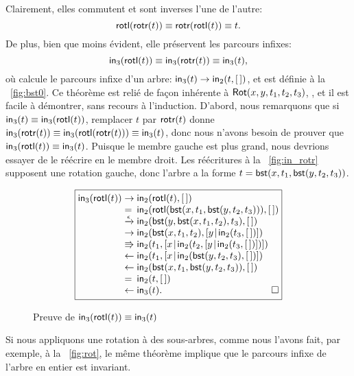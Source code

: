 Clairement, elles commutent et sont inverses l'une de l'autre:
\begin{equation*}
\abovedisplayskip=5pt
\belowdisplayskip=5pt
\fun{rotl}(\fun{rotr}(t)) \equiv \fun{rotr}(\fun{rotl}(t)) \equiv t.
\end{equation*}
De plus, bien que moins évident, elle préservent les parcours infixes:
\begin{equation*}
  \abovedisplayskip=5pt
  \belowdisplayskip=5pt
  \fun{in}_3(\fun{rotl}(t)) \equiv \fun{in}_3(\fun{rotr}(t)) \equiv
  \fun{in}_3(t),
\end{equation*}
où  calcule le parcours
infixe d'un arbre: \(\textsf{in}_3(t) \rightarrow \textsf{in}_2(t,[\,])\), et
 est définie à la
\fig~\vref{fig:bst0}. Ce théorème est relié de façon inhérente à
\(\textsf{Rot}({x,y,t_1,t_2,t_3})\),
, et il est facile à démontrer, sans recours à
l'induction. D'abord, nous remarquons que si \(\textsf{in}_3(t) \equiv
\textsf{in}_3(\textsf{rotl}(t))\), remplacer \(t\) par \(\textsf{rotr}(t)\)
donne \(\textsf{in}_3(\textsf{rotr}(t)) \equiv
\textsf{in}_3(\textsf{rotl}(\textsf{rotr}(t))) \equiv \textsf{in}_3(t)\), donc
nous n'avons besoin de prouver que \(\textsf{in}_3(\textsf{rotl}(t)) \equiv
\textsf{in}_3(t)\). Puisque le membre gauche est plus grand, nous
devrions essayer de le réécrire en le membre droit. Les réécritures à
la \fig~\vref{fig:in_rotr} supposent une rotation gauche, donc l'arbre
a la forme \(t=\textsf{bst}(x,t_1,\textsf{bst}(y,t_2,t_3))\).
\begin{figure}
  \begin{equation*}
    \boxed{
      \begin{array}{@{}r@{\;}l@{\;}l@{}}
  \fun{in}_3(\fun{rotl}(t))
  & \rightarrow & \fun{in}_2(\fun{rotl}(t),\el)\\
  & = & \fun{in}_2(\fun{rotl}(\fun{bst}(x,t_1,\fun{bst}(y,t_2,t_3))),\el)\\
  & \xrightarrow{\smash{\epsilon}} &
  \fun{in}_2(\fun{bst}(y,\fun{bst}(x,t_1,t_2),t_3),\el)\\
  & \rightarrow &
  \fun{in}_2(\fun{bst}(x,t_1,t_2),\cons{y}{\fun{in}_2(t_3,\el)})\\
  & \Rrightarrow &
 \fun{in}_2(t_1,\cons{x}{\fun{in}_2(t_2,\cons{y}{\fun{in}_2(t_3,\el)})})\\
  & \leftarrow &
  \fun{in}_2(t_1,\cons{x}{\fun{in}_2(\fun{bst}(y,t_2,t_3),\el)})\\
  & \leftarrow &
  \fun{in}_2(\fun{bst}(x,t_1,\fun{bst}(y,t_2,t_3)),\el)\\
  & = &
  \fun{in}_2(t,\el)\\
  & \leftarrow &
  \fun{in}_3(t).\hfill\Box
\end{array}
}
\end{equation*}
\caption{Preuve de \(\textsf{in}_3(\textsf{rotl}(t)) \equiv
  \textsf{in}_3(t)\)}
\label{fig:in_rotr}
\end{figure}
Si nous appliquons une rotation à des sous-arbres, comme nous l'avons
fait, par exemple, à la \fig~\vref{fig:rot}, le même théorème implique
que le parcours infixe de l'arbre en entier est invariant.

